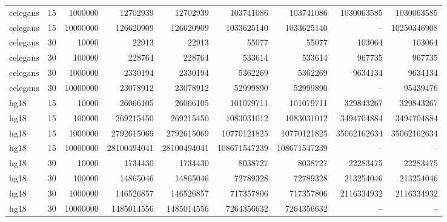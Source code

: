 \begin{tabular}{lrrrrrrrr}
  celegans & 15 & 1000000 & 12702939 & 12702939 & 103741086 & 103741086 & 1030063585 & 1030063585 \\ 
  celegans & 15 & 10000000 & 126620909 & 126620909 & 1033625140 & 1033625140 & -- & 10250346908 \\ 
  celegans & 30 & 10000 & 22913 & 22913 & 55077 & 55077 & 103064 & 103064 \\ 
  celegans & 30 & 100000 & 228764 & 228764 & 533614 & 533614 & 967735 & 967735 \\ 
  celegans & 30 & 1000000 & 2330194 & 2330194 & 5362269 & 5362269 & 9634134 & 9634134 \\ 
  celegans & 30 & 10000000 & 23078912 & 23078912 & 52999890 & 52999890 & -- & 95439476 \\ 
  hg18 & 15 & 10000 & 26066105 & 26066105 & 101079711 & 101079711 & 329843267 & 329843267 \\ 
  hg18 & 15 & 100000 & 269215450 & 269215450 & 1083031012 & 1083031012 & 3494704884 & 3494704884 \\ 
  hg18 & 15 & 1000000 & 2792615069 & 2792615069 & 10770121825 & 10770121825 & 35062162634 & 35062162634 \\ 
  hg18 & 15 & 10000000 & 28100494041 & 28100494041 & 108671547239 & 108671547239 & -- & -- \\ 
  hg18 & 30 & 10000 & 1734430 & 1734430 & 8038727 & 8038727 & 22283475 & 22283475 \\ 
  hg18 & 30 & 100000 & 14865046 & 14865046 & 72789328 & 72789328 & 213254046 & 213254046 \\ 
  hg18 & 30 & 1000000 & 146526857 & 146526857 & 717357806 & 717357806 & 2116334932 & 2116334932 \\ 
  hg18 & 30 & 10000000 & 1485014556 & 1485014556 & 7264356632 & 7264356632 & -- & -- \\ 
   \bottomrule \end{tabular}
